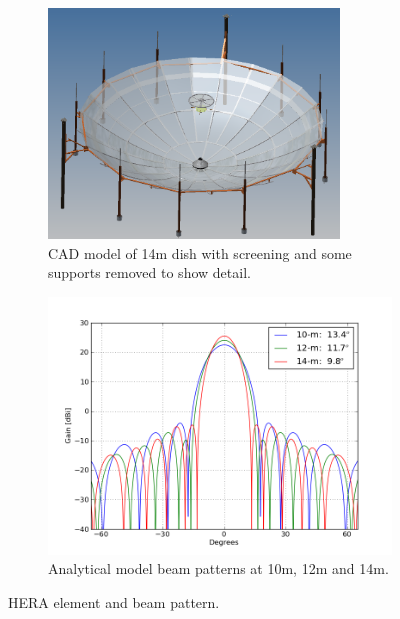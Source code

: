 \documentclass[preprint]{aastex}
\begin{document}

\begin{figure}[h]
	\centering
	\begin{subfigure}[b]{0.46\textwidth}
		\includegraphics[width=0.85\textwidth]{plots/dish.png}
		\caption{CAD model of 14m dish with screening and some supports removed to show detail.}
		\label{fig:dish} 
	\end{subfigure}
\quad
	\begin{subfigure}[b]{0.46\textwidth}
		\includegraphics[width=\textwidth]{plots/hera_beam.png}
		\caption{Analytical model beam patterns at 10m, 12m and 14m.}
		\label{fig:beam} 
	\end{subfigure}
	\caption{HERA element and beam pattern.}
\end{figure}
\end{document}
